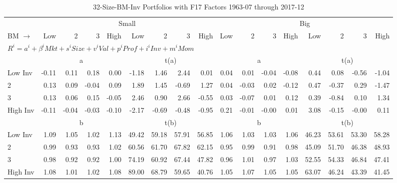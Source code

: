 
\begin{table}[!ht]
\footnotesize
\centering
\caption{32-Size-BM-Inv Portfolios with F17 Factors 1963-07 through 2017-12}
\begin{tabular}{lrrrrrrrrrrrrrrrr}
  \toprule
     & \multicolumn{8}{c}{Small} & \multicolumn{8}{c}{Big}  \\
     \cmidrule(r){2-9} \cmidrule(r){10-17}
    BM $\rightarrow$ & Low & 2 & 3 & High & Low & 2 & 3 & High & Low & 2 & 3 & High & Low & 2 & 3 & High  \\ 
  \midrule
  \multicolumn{17}{l}{$R^i=a^i+\beta^iMkt+s^iSize+v^iVal+p^iProf+i^iInv+m^iMom$}  \\
  
     & \multicolumn{4}{c}{a} & \multicolumn{4}{c}{t(a)}  & \multicolumn{4}{c}{a} & \multicolumn{4}{c}{t(a)}   \\
     \cmidrule(r){2-5} \cmidrule(r){6-9}  \cmidrule(r){10-13} \cmidrule(r){14-17} 
    Low Inv  & -0.11  & 0.11  & 0.18  & 0.00  & -1.18  & 1.46  & 2.44  & 0.01  & 0.04  & 0.01  & -0.04  & -0.08  & 0.44  & 0.08  & -0.56  & -1.04   \\
    2  & 0.13  & 0.09  & -0.04  & 0.09  & 1.89  & 1.45  & -0.69  & 1.27  & 0.04  & -0.03  & 0.02  & -0.12  & 0.47  & -0.37  & 0.29  & -1.47   \\
    3  & 0.13  & 0.06  & 0.15  & -0.05  & 2.46  & 0.90  & 2.66  & -0.55  & 0.03  & -0.07  & 0.01  & 0.12  & 0.39  & -0.84  & 0.10  & 1.34   \\
    High Inv  & -0.11  & -0.04  & -0.03  & -0.10  & -2.17  & -0.69  & -0.48  & -0.95  & 0.21  & -0.01  & -0.00  & 0.01  & 3.08  & -0.15  & -0.00  & 0.11   \\
    
  
     & \multicolumn{4}{c}{b} & \multicolumn{4}{c}{t(b)}  & \multicolumn{4}{c}{b} & \multicolumn{4}{c}{t(b)}   \\
     \cmidrule(r){2-5} \cmidrule(r){6-9}  \cmidrule(r){10-13} \cmidrule(r){14-17} 
    Low Inv  & 1.09  & 1.05  & 1.02  & 1.13  & 49.42  & 59.18  & 57.91  & 56.85  & 1.06  & 1.03  & 1.03  & 1.06  & 46.23  & 53.61  & 53.30  & 58.28   \\
    2  & 0.99  & 0.93  & 0.93  & 1.02  & 60.56  & 61.70  & 67.82  & 62.15  & 0.95  & 0.99  & 0.91  & 0.98  & 45.09  & 51.70  & 46.38  & 48.93   \\
    3  & 0.98  & 0.92  & 0.92  & 1.00  & 74.19  & 60.92  & 67.44  & 47.82  & 0.96  & 1.01  & 0.97  & 1.03  & 52.55  & 54.33  & 46.84  & 47.41   \\
    High Inv  & 1.08  & 1.01  & 1.02  & 1.08  & 89.00  & 68.79  & 59.65  & 40.76  & 1.05  & 1.07  & 1.05  & 1.05  & 63.07  & 46.24  & 43.39  & 41.45   \\
    

\end{tabular}
\end{table}
